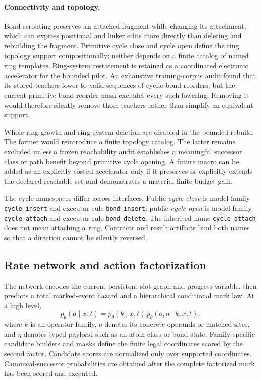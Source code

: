 \paragraph{Connectivity and topology.}
Bond rerouting preserves an attached fragment while changing its attachment,
which can express positional and linker edits more directly than deleting and
rebuilding the fragment. Primitive cycle close and cycle open define the ring
topology support compositionally; neither depends on a finite catalog of named
ring templates. Ring-system restatement is retained as a coordinated
electronic accelerator for the bounded pilot. An exhaustive training-corpus
audit found that its stored teachers lower to valid sequences of cyclic bond
reorders, but the current primitive bond-reorder mask excludes every such
lowering. Removing it would therefore silently remove those teachers rather
than simplify an equivalent support.

Whole-ring growth and ring-system deletion are disabled in the bounded rebuild.
The former would reintroduce a finite topology catalog. The latter remains
excluded unless a frozen reachability audit establishes a meaningful
successor class or path benefit beyond primitive cycle opening. A future macro
can be added as an explicitly costed accelerator only if it preserves or
explicitly extends the declared reachable set and demonstrates a material
finite-budget gain.

The cycle namespaces differ across interfaces. Public \emph{cycle close} is
model family \texttt{cycle\_insert} and executor rule
\texttt{bond\_insert}; public \emph{cycle open} is model family
\texttt{cycle\_attach} and executor rule \texttt{bond\_delete}. The inherited
name \texttt{cycle\_attach} does not mean attaching a ring. Contracts and
result artifacts bind both names so that a direction cannot be silently
reversed.

\subsection{Rate network and action factorization}

The network encodes the current persistent-slot graph and progress variable,
then predicts a total marked-event hazard and a hierarchical conditional mark
law. At a high level,
\[
  p_\theta(a\mid x,t)
  =
  p_\theta(k\mid x,t)\,
  p_\theta(o,\eta\mid k,x,t),
\]
where $k$ is an operator family, $o$ denotes its concrete operands or matched
sites, and $\eta$ denotes typed payload such as an atom class or bond state.
Family-specific candidate builders and masks define the finite legal
coordinates scored by the second factor. Candidate scores are normalized only
over supported coordinates. Canonical-successor probabilities are obtained
after the complete factorized mark has been scored and executed.

